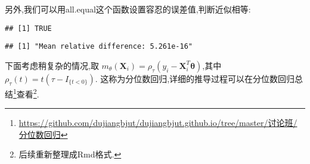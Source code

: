 \documentclass[]{ctexbook}
\newenvironment{Shaded}{\begin{snugshade}}{\end{snugshade}}
\newcommand{\DataTypeTok}[1]{\textcolor[rgb]{0.13,0.29,0.53}{#1}}
\newcommand{\DecValTok}[1]{\textcolor[rgb]{0.00,0.00,0.81}{#1}}
\newcommand{\FloatTok}[1]{\textcolor[rgb]{0.00,0.00,0.81}{#1}}
\newcommand{\KeywordTok}[1]{\textcolor[rgb]{0.13,0.29,0.53}{\textbf{#1}}}
\newcommand{\NormalTok}[1]{#1}
\newcommand{\OperatorTok}[1]{\textcolor[rgb]{0.81,0.36,0.00}{\textbf{#1}}}
\renewcommand{\href}[2]{#2\footnote{\url{#1}}}
\begin{document}
另外,我们可以用all.equal这个函数设置容忍的误差值,判断近似相等:

\begin{Shaded}
\end{Shaded}

\begin{verbatim}
## [1] TRUE
\end{verbatim}

\begin{Shaded}
\end{Shaded}

\begin{verbatim}
## [1] "Mean relative difference: 5.261e-16"
\end{verbatim}

下面考虑稍复杂的情况,取
\(m_{\theta}\left(\boldsymbol{X}_{i}\right)=\rho_{\tau}\left(y_{i}-\boldsymbol{X}_{i}^{T} \boldsymbol{\theta}\right)\),其中
\(\rho_{\tau}(t)=t\left(\tau-I_{\{t<0\}}\right)\).
这称为分位数回归,详细的推导过程可以在\href{https://github.com/dujiangbjut/dujiangbjut.github.io/tree/master/讨论班/分位数回归}{分位数回归总结}查看\footnote{后续重新整理成Rmd格式.}.
\end{document}
